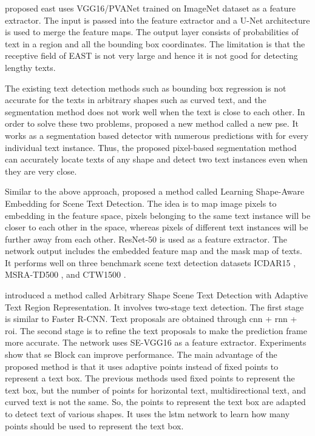 	\cite{zhou2017east} proposed \gls{east} uses VGG16/PVANet trained on ImageNet dataset as a feature extractor. The input is passed into the feature extractor and a U-Net architecture is used to merge the feature maps. The output layer consists of probabilities of text in a region and all the bounding box coordinates. The limitation is that the receptive field of EAST is not very large and hence it is not good for detecting lengthy texts.
\newline
	
	The existing text detection methods such as bounding box regression is not accurate for the texts in arbitrary shapes such as curved text, and the segmentation method does not work well when the text is close to each other. In order to solve these two problems, \cite{wang2019shape} proposed a new method called a new \gls{pse}. It works as a segmentation based detector with numerous predictions with for every individual text instance. Thus, the proposed pixel-based segmentation method can accurately locate texts of any shape and detect two text instances even when they are very close. 
\newline
	
	Similar to the above approach, \cite{tian2019learning} proposed a method called Learning Shape-Aware Embedding for Scene Text Detection. The idea is to map image pixels to embedding in the feature space, pixels belonging to the same text instance will be closer to each other in the space, whereas pixels of different text instances will be further away from each other. ResNet-50 is used as a feature extractor. The network output includes the embedded feature map and the mask map of texts. It performs well on three benchmark scene text detection datasets ICDAR15 \citep{icdar}, MSRA-TD500 \citep{msra}, and CTW1500 \citep{yuan2019ctw}.
\newline
	
	\cite{wang2019arbitrary} introduced a method called Arbitrary Shape Scene Text Detection with Adaptive Text Region Representation. It involves two-stage text detection. The first stage is similar to Faster R-CNN. Text proposals are obtained through \gls{cnn} + \gls{rnn} + \gls{roi}. The second stage is to refine the text proposals to make the prediction frame more accurate. The network uses SE-VGG16 as a feature extractor. Experiments show that \gls{se} Block can improve performance. The main advantage of the proposed method is that it uses adaptive points instead of fixed points to represent a text box. The previous methods used fixed points to represent the text box, but the number of points for horizontal text, multidirectional text, and curved text is not the same. So, the points to represent the text box are adapted to detect text of various shapes. It uses the \gls{lstm} network to learn how many points should be used to represent the text box.
\newline
	
